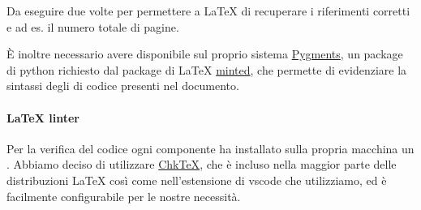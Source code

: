 \documentclass[../../norme-di-progetto.tex]{subfiles}
\begin{document}
Da eseguire due volte per permettere a \LaTeX{} di recuperare i riferimenti corretti e ad es\@. il numero totale di pagine.

È inoltre necessario avere disponibile sul proprio sistema \href{https://pygments.org/}{Pygments}, un package di python richiesto dal package di \LaTeX{} \href{https://ctan.org/pkg/minted?lang=en}{minted}, che permette di evidenziare la sintassi degli  di codice presenti nel documento.

\paragraph{\LaTeX{} linter}%
\label{par:latex_linter}

Per la verifica del codice ogni componente ha installato sulla propria macchina un .
Abbiamo deciso di utilizzare \href{https://www.nongnu.org/chktex/}{Chk\TeX}, che è incluso nella maggior parte delle distribuzioni \LaTeX{} così come nell'estensione di vscode che utilizziamo, ed è facilmente configurabile per le nostre necessità.
\end{document}
